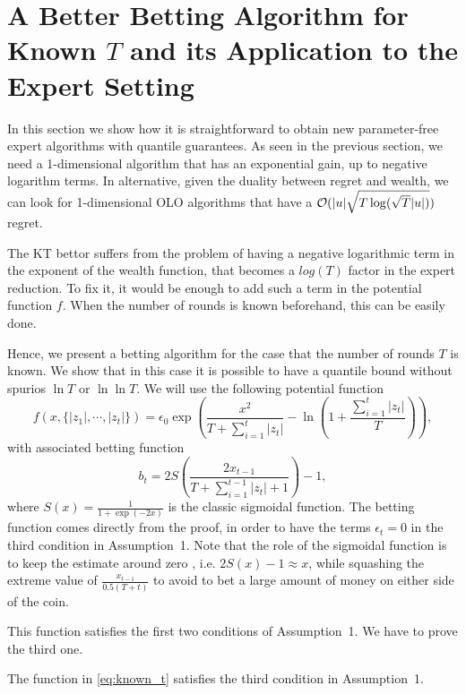 \section{A Better Betting Algorithm for Known $T$ and its Application to the Expert Setting}

In this section we show how it is straightforward to obtain new parameter-free expert algorithms with quantile guarantees.
As seen in the previous section, we need a 1-dimensional algorithm that has an exponential gain, up to negative logarithm terms. In alternative, given the duality between regret and wealth, we can look for 1-dimensional \ac{OLO} algorithms that have a $\mathcal{O}(|u|\sqrt{T \log(\sqrt{T} |u|)})$ regret.

The \ac{KT} bettor suffers from the problem of having a negative logarithmic term in the exponent of the wealth function, that becomes a $log(T)$ factor in the expert reduction.
To fix it, it would be enough to add such a term in the potential function $f$. When the number of rounds is known beforehand, this can be easily done.

Hence, we present a betting algorithm for the case that the number of rounds $T$ is known. We show that in this case it is possible to have a quantile bound without spurios $\ln T$ or $\ln \ln T$.
We will use the following potential function
\begin{equation}
\label{eq:known_t}
f(x,\{|z_1|,\cdots, |z_t|\})=\epsilon_0 \exp\left(\frac{x^2}{T+\sum_{i=1}^{t} |z_t|}-\ln\left(1+\frac{\sum_{i=1}^{t} |z_t|}{T}\right)\right),
\end{equation}
with associated betting function
\[
b_t=2 S\left(\frac{2 x_{t-1}}{T+\sum_{i=1}^{t-1} |z_t|+1}\right)-1,
\]
where $S(x)=\frac{1}{1+\exp(-2 x)}$ is the classic sigmoidal function.
The betting function comes directly from the proof, in order to have the terms $\epsilon_t=0$ in the third condition in Assumption~1.
Note that the role of the sigmoidal function is to keep the estimate around zero , i.e. $2 S(x)-1\approx x$, while squashing the extreme value of $\frac{x_{t-1}}{0.5 (T+t)}$ to avoid to bet a large amount of money on either side of the coin.

This function satisfies the first two conditions of Assumption~1.
We have to prove the third one.

\begin{theorem}
\label{theo:known_t}
The function in \eqref{eq:known_t} satisfies the third condition in Assumption~1.
\end{theorem}


